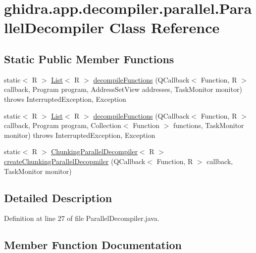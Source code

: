 \hypertarget{classghidra_1_1app_1_1decompiler_1_1parallel_1_1_parallel_decompiler}{}\section{ghidra.\+app.\+decompiler.\+parallel.\+Parallel\+Decompiler Class Reference}
\label{classghidra_1_1app_1_1decompiler_1_1parallel_1_1_parallel_decompiler}
\subsection*{Static Public Member Functions}
\begin{DoxyCompactItemize}
\item 
static$<$ R $>$ \mbox{\hyperlink{xml_8hh_ab5ab62f46b3735557c125f91b40ac155}{List}}$<$ R $>$ \mbox{\hyperlink{classghidra_1_1app_1_1decompiler_1_1parallel_1_1_parallel_decompiler_a7b17ca6d07341440ab1fca5e5c4d437d}{decompile\+Functions}} (Q\+Callback$<$ Function, R $>$ callback, Program program, Address\+Set\+View addresses, Task\+Monitor monitor)  throws Interrupted\+Exception, Exception 
\item 
static$<$ R $>$ \mbox{\hyperlink{xml_8hh_ab5ab62f46b3735557c125f91b40ac155}{List}}$<$ R $>$ \mbox{\hyperlink{classghidra_1_1app_1_1decompiler_1_1parallel_1_1_parallel_decompiler_ac860fec7f7fa5092f9e0851aef5f10dd}{decompile\+Functions}} (Q\+Callback$<$ Function, R $>$ callback, Program program, Collection$<$ Function $>$ functions, Task\+Monitor monitor)  throws Interrupted\+Exception, Exception 
\item 
static$<$ R $>$ \mbox{\hyperlink{classghidra_1_1app_1_1decompiler_1_1parallel_1_1_chunking_parallel_decompiler}{Chunking\+Parallel\+Decompiler}}$<$ R $>$ \mbox{\hyperlink{classghidra_1_1app_1_1decompiler_1_1parallel_1_1_parallel_decompiler_a558696e469ffcc084648f01c8db1dab5}{create\+Chunking\+Parallel\+Decopmiler}} (Q\+Callback$<$ Function, R $>$ callback, Task\+Monitor monitor)
\end{DoxyCompactItemize}


\subsection{Detailed Description}


Definition at line 27 of file Parallel\+Decompiler.\+java.



\subsection{Member Function Documentation}
\mbox{\label{classghidra_1_1app_1_1decompiler_1_1parallel_1_1_parallel_decompiler_a558696e469ffcc084648f01c8db1dab5}} 

